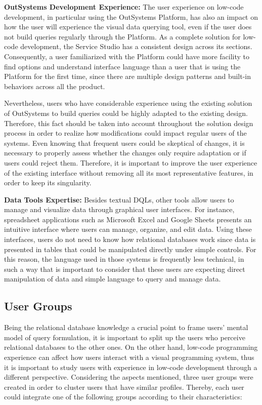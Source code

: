 \medskip

\textbf{OutSystems Development Experience: } The user experience on low-code development, in particular using the OutSystems Platform, has also an impact on how the user will experience the visual data querying tool, even if the user does not build queries regularly through the Platform. As a complete solution for low-code development, the Service Studio has a consistent design across its sections. Consequently, a user familiarized with the Platform could have more facility to find options and understand interface language than a user that is using the Platform for the first time, since there are multiple design patterns and built-in behaviors across all the product.

Nevertheless, users who have considerable experience using the existing solution of OutSystems to build queries could be highly adapted to the existing design. Therefore, this fact should be taken into account throughout the solution design process in order to realize how modifications could impact regular users of the systems. Even knowing that frequent users could be skeptical of changes, it is necessary to properly assess whether the changes only require adaptation or if users could reject them. Therefore, it is important to improve the user experience of the existing interface without removing all its most representative features, in order to keep its singularity.

\medskip

\textbf{Data Tools Expertise: } Besides textual \glspl{DQL}, other tools allow users to manage and visualize data through graphical user interfaces. For instance, spreadsheet applications such as Microsoft Excel \cite{microsoftExcel} and Google Sheets \cite{googleSheets} presents an intuitive interface where users can manage, organize, and edit data. Using these interfaces, users do not need to know how relational databases work since data is presented in tables that could be manipulated directly under simple controls. For this reason, the language used in those systems is frequently less technical, in such a way that is important to consider that these users are expecting direct manipulation of data and simple language to query and manage data.


\subsection{User Groups}
\label{subsec:user_groups}

Being the relational database knowledge a crucial point to frame users' mental model of query formulation, it is important to split up the users who perceive relational databases to the other ones. On the other hand, low-code programming experience can affect how users interact with a visual programming system, thus it is important to study users with experience in low-code development through a different perspective. Considering the aspects mentioned, three user groups were created in order to cluster users that have similar profiles. Thereby, each user could integrate one of the following groups according to their characteristics:

